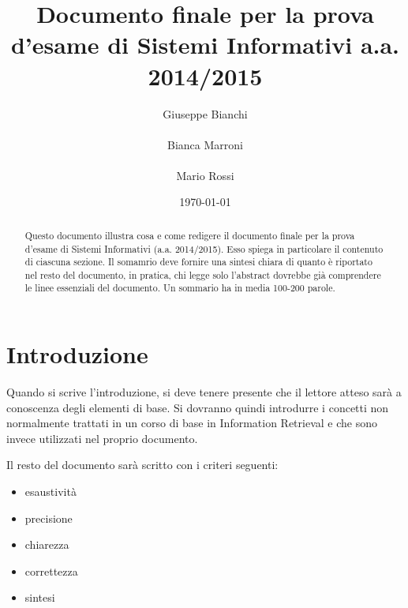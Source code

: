 \documentclass{llncs}
\begin{document}
\title{Documento finale per la prova d'esame di Sistemi Informativi
  a.a. 2014/2015} 
\author{
  Giuseppe Bianchi\\\\ 
  Bianca Marroni\\\\ 
  Mario Rossi\\} 
\institute{}

\date{\today}

\maketitle
\begin{abstract}
  Questo documento illustra cosa e come redigere il documento finale per la
  prova d'esame di Sistemi Informativi (a.a. 2014/2015). Esso spiega in
  particolare il contenuto di ciascuna sezione. Il somamrio deve fornire una
  sintesi chiara di quanto \`e riportato nel resto del documento, in pratica,
  chi legge solo l'abstract dovrebbe gi\`a comprendere le linee essenziali del
  documento. Un sommario ha in media 100-200 parole.
\end{abstract}

\section{Introduzione}
\label{sec:introduzione}

Quando si scrive l'introduzione, si deve tenere presente che il lettore atteso
sar\`a a conoscenza degli elementi di base. Si dovranno quindi introdurre i
concetti non normalmente trattati in un corso di base in Information Retrieval e
che sono invece utilizzati nel proprio documento.

Il resto del documento sar\`a scritto con i criteri seguenti:
\begin{itemize}
\item esaustivit\`a
\item precisione
\item chiarezza
\item correttezza
\item sintesi
\end{itemize}
\end{document}
